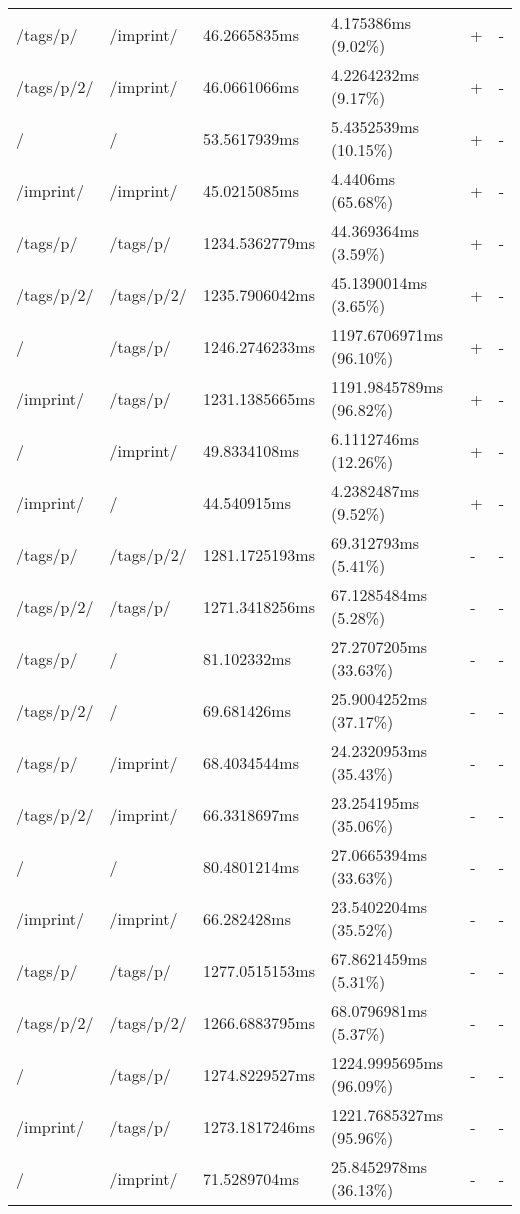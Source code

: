 \begin{appendix}
\begin{center}
\begin{longtable}{llllll}
	/tags/p/ & /imprint/ & 46.2665835ms & 4.175386ms (9.02\%) & + & - \\
	/tags/p/2/ & /imprint/ & 46.0661066ms & 4.2264232ms (9.17\%) & + & - \\
	\hline
	/ & / & 53.5617939ms & 5.4352539ms (10.15\%) & + & - \\
	/imprint/ & /imprint/ & 45.0215085ms & 4.4406ms (65.68\%) & + & - \\
	/tags/p/ & /tags/p/ & 1234.5362779ms & 44.369364ms (3.59\%) & + & - \\
	/tags/p/2/ & /tags/p/2/ & 1235.7906042ms & 45.1390014ms (3.65\%) & + & - \\
	\hline
	/ & /tags/p/ & 1246.2746233ms & 1197.6706971ms (96.10\%) & + & - \\
	/imprint/ & /tags/p/ & 1231.1385665ms & 1191.9845789ms (96.82\%) & + & - \\
	\hline
	/ & /imprint/ & 49.8334108ms & 6.1112746ms (12.26\%) & + & - \\
	/imprint/ & / & 44.540915ms & 4.2382487ms (9.52\%) & + & - \\
	\hline
	\hline
	/tags/p/ & /tags/p/2/ & 1281.1725193ms & 69.312793ms (5.41\%) & - & - \\
	/tags/p/2/ & /tags/p/ & 1271.3418256ms & 67.1285484ms (5.28\%) & - & - \\
	\hline
	/tags/p/ & / & 81.102332ms & 27.2707205ms (33.63\%) & - & - \\
	/tags/p/2/ & / & 69.681426ms & 25.9004252ms (37.17\%) & - & - \\
	/tags/p/ & /imprint/ & 68.4034544ms & 24.2320953ms (35.43\%) & - & - \\
	/tags/p/2/ & /imprint/ & 66.3318697ms & 23.254195ms (35.06\%) & - & - \\
	\hline
	/ & / & 80.4801214ms & 27.0665394ms (33.63\%) & - & - \\
	/imprint/ & /imprint/ & 66.282428ms & 23.5402204ms (35.52\%) & - & - \\
	/tags/p/ & /tags/p/ & 1277.0515153ms & 67.8621459ms (5.31\%) & - & - \\
	/tags/p/2/ & /tags/p/2/ & 1266.6883795ms & 68.0796981ms (5.37\%) & - & - \\
	\hline
	/ & /tags/p/ & 1274.8229527ms & 1224.9995695ms (96.09\%) & - & - \\
	/imprint/ & /tags/p/ & 1273.1817246ms & 1221.7685327ms (95.96\%) & - & - \\
	\hline
	/ & /imprint/ & 71.5289704ms & 25.8452978ms (36.13\%) & - & - \\

\end{longtable}
\end{center}
\end{appendix}
